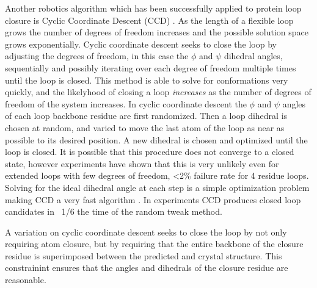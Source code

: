 Another robotics algorithm which has been successfully applied to protein loop closure is Cyclic Coordinate Descent (CCD) \cite{canutescu2003cyclic}.
As the length of a flexible loop grows the number of degrees of freedom increases and the possible solution space grows exponentially. 
Cyclic coordinate descent seeks to close the loop by adjusting the degrees of freedom, in this case the $\phi$ and $\psi$ dihedral angles, sequentially and possibly iterating over each degree of freedom multiple times until the loop is closed.
This method is able to solve for conformations very quickly, and the likelyhood of closing a loop {\it increases} as the number of degrees of freedom of the system increases.
In cyclic coordinate descent the $\phi$ and $\psi$ angles of each loop backbone residue are first randomized.
Then a loop dihedral is chosen at random, and varied to move the last atom of the loop as near as possible to its desired position.
A new dihedral is chosen and optimized until the loop is closed.
It is possible that this procedure does not converge to a closed state, however experiments have shown that this is very unlikely even for extended loops with few degrees of freedom, <2\% failure rate for 4 residue loops.
Solving for the ideal dihedral angle at each step is a simple optimization problem making CCD a very fast algorithm \cite{wang1991combined,canutescu2003cyclic}.
In experiments CCD produces closed loop candidates in ~1/6 the time of the random tweak method.

A variation on cyclic coordinate descent seeks to close the loop by not only requiring atom closure, but by requiring that the entire backbone of the closure residue is superimposed between the predicted and crystal structure.
This constrainint ensures that the angles and dihedrals of the closure residue are reasonable\cite{canutescu2003cyclic}.
